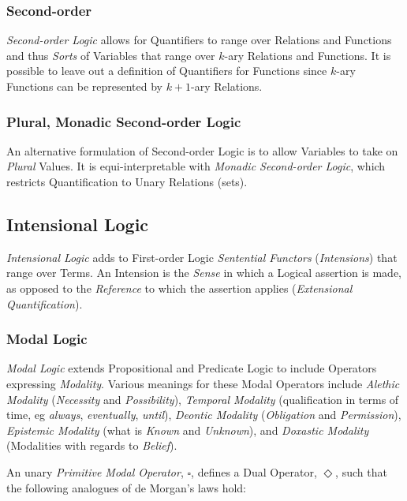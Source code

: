 \documentclass{article}
\begin{document}
\subsubsection{Second-order}

\emph{Second-order Logic} allows for Quantifiers to range over
Relations and Functions and thus \emph{Sorts} of Variables that range
over $k$-ary Relations and Functions. It is possible to leave out a
definition of Quantifiers for Functions since $k$-ary Functions can be
represented by $k+1$-ary Relations.\cite{shapiro00}

\subsubsection{Plural, Monadic Second-order Logic}

An alternative formulation of Second-order Logic is to allow Variables
to take on \emph{Plural} Values. It is equi-interpretable with
\emph{Monadic Second-order Logic}, which restricts Quantification to
Unary Relations (sets).

\subsection{Intensional Logic}

\emph{Intensional Logic} adds to First-order Logic \emph{Sentential
  Functors} (\emph{Intensions}) that range over Terms. An Intension is
the \emph{Sense} in which a Logical assertion is made, as opposed to
the \emph{Reference} to which the assertion applies (\emph{Extensional
  Quantification}).

\subsubsection{Modal Logic} \label{subsec:modal_logic}

\emph{Modal Logic} extends Propositional and Predicate Logic to
include Operators expressing \emph{Modality}. Various meanings for
these Modal Operators include \emph{Alethic Modality}
(\emph{Necessity} and \emph{Possibility}), \emph{Temporal Modality}
(qualification in terms of time, eg \emph{always}, \emph{eventually},
\emph{until}), \emph{Deontic Modality} (\emph{Obligation} and
\emph{Permission}), \emph{Epistemic Modality} (what is \emph{Known}
and \emph{Unknown}), and \emph{Doxastic Modality} (Modalities with
regards to \emph{Belief}).

An unary \emph{Primitive Modal Operator}, $\square$, defines a Dual
Operator, $\Diamond$, such that the following analogues of de Morgan's
laws hold:
\end{document}
